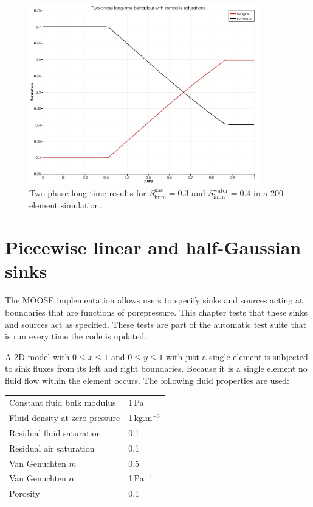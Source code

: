 \documentclass[]{scrreprt}
\begin{document}
\begin{figure}[htb]
\centering
\includegraphics[width=10cm]{gh2.eps}
\caption{Two-phase long-time results for
  $S^{\mathrm{gas}}_{\mathrm{imm}}=0.3$ and
  $S^{\mathrm{water}}_{\mathrm{imm}}=0.4$ in a 200-element simulation.}
\label{gh2.fig}
\end{figure}


\chapter{Piecewise linear and half-Gaussian sinks}
\label{si}

The MOOSE implementation allows users to specify sinks and sources
acting at boundaries that are functions of porepressure.  This chapter
tests that these sinks and sources act as specified.  These tests are
part of the automatic test suite that is run every time the code is
updated.

A 2D model with $0\leq x \leq 1$ and $0\leq y \leq 1$ with just a
single element is subjected to sink fluxes from its left and right
boundaries.  Because it is a single element no fluid flow within the
element occurs.  The following fluid properties are used:
\begin{center}
\begin{tabular}{|ll|}
\hline
Constant fluid bulk modulus & 1\,Pa \\
Fluid density at zero pressure & 1\,kg.m$^{-3}$ \\
Residual fluid saturation & 0.1 \\
Residual air saturation & 0.1 \\
Van Genuchten $m$ & 0.5 \\
Van Genuchten $\alpha$ & 1\,Pa$^{-1}$ \\
Porosity & 0.1 \\
\hline
\end{tabular} 
\end{center}
\end{document}
